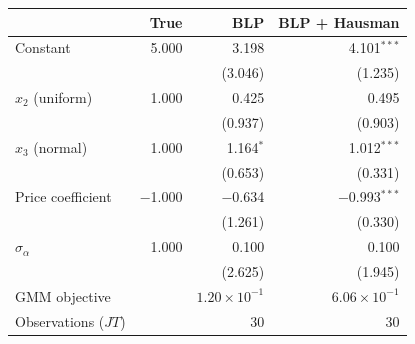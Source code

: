 \begin{tabular}{lrrr}
\toprule
 & True & BLP & BLP + Hausman \\
\midrule
Constant & 5.000 & 3.198 & 4.101$^{***}$ \\
 &  & (3.046) & (1.235) \\
$x_2$ (uniform) & 1.000 & 0.425 & 0.495 \\
 &  & (0.937) & (0.903) \\
$x_3$ (normal) & 1.000 & 1.164$^{*}$ & 1.012$^{***}$ \\
 &  & (0.653) & (0.331) \\
Price coefficient & $-$1.000 & $-$0.634 & $-$0.993$^{***}$ \\
 &  & (1.261) & (0.330) \\
$\sigma_\alpha$ & 1.000 & 0.100 & 0.100 \\
 &  & (2.625) & (1.945) \\
\midrule
GMM objective &  & $1.20\times10^{-1}$ & $6.06\times10^{-1}$ \\
Observations ($JT$) &  & 30 & 30 \\
\bottomrule
\end{tabular}
